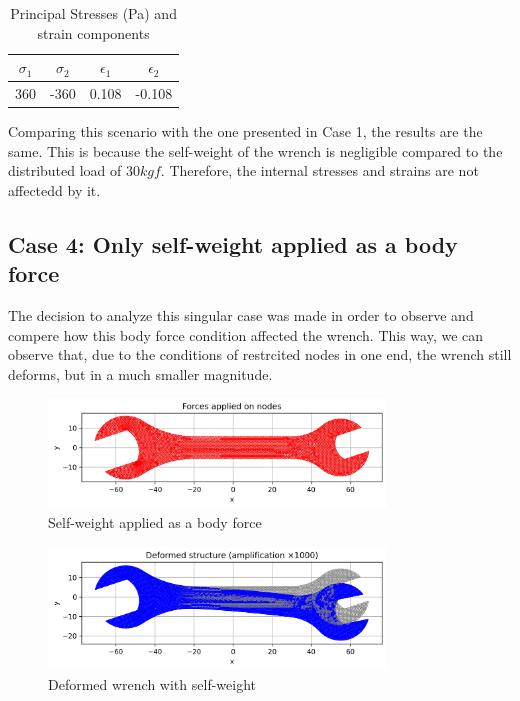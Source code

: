 \begin{table}[H]
    \centering
    \caption{Principal Stresses (Pa) and strain components}
    \begin{tabular}{|c|c|c|c|}
    \hline
    $\sigma_{1}$ & $\sigma_{2}$ & $\epsilon_{1}$ & $\epsilon_{2}$ \\
    \hline
    360 & -360 & 0.108 & -0.108 \\
    \hline
    \end{tabular}
    \label{tab:tabla2}
\end{table}

Comparing this scenario with the one presented in Case 1, the results are the same. This is because the self-weight of the wrench is negligible compared to the distributed load of $30 kgf$. Therefore, the internal stresses and strains are not affectedd by it.

\subsection{Case 4: Only self-weight applied as a body force}

The decision to analyze this singular case was made in order to observe and compere how this body force condition affected the wrench. This way, we can observe that, due to the conditions of restrcited nodes in one end, the wrench still deforms, but in a much smaller magnitude.

\begin{figure}[H]
    \centering
    \includegraphics[width=0.8\textwidth]{GRAFICOS/Case d_fuerzas.png}
    \caption{Self-weight applied as a body force}
    \label{fig:bf}
\end{figure}

\begin{figure}[H]
    \centering
    \includegraphics[width=0.8\textwidth]{GRAFICOS/Case d_deformada.png}
    \caption{Deformed wrench with self-weight}
    \label{fig:bf1}
\end{figure}

